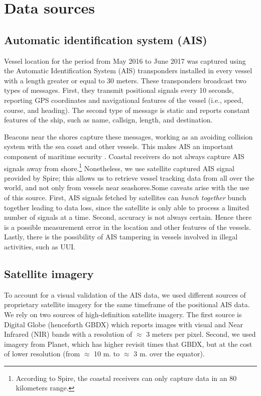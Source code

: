 \section{Data sources}
\subsection{Automatic identification system (AIS)}
Vessel location for the period from May 2016 to June 2017  was captured using the Automatic 
Identification System (AIS) transponders installed in every vessel with a length greater or equal to 
30 meters. These transponders broadcast two types of messages. First, they transmit positional signals 
every 10 seconds, reporting GPS coordinates and navigational features of the vessel (i.e., speed, course, 
and heading). The second type of message is static and reports constant features of the ship, such as name, 
callsign, length, and destination. 

Beacons near the shores capture these messages, working as an avoiding collision system with the sea coast and 
other vessels. This makes AIS an important component of maritime security \cite{Tetreault2005}. 
Coastal receivers do not always capture AIS signals away from shore.\footnote{According to Spire, the coastal 
receivers can only capture data in an 80 kilometers range.} Nonetheless, we use satellite captured AIS signal 
provided by Spire; this allows us to retrieve vessel tracking data from all over the world, and not only from 
vessels near seashores.Some caveats arise with the use of this source. First, AIS signals fetched by satellites
can \textit{bunch together} bunch together leading to data loss, since the satellite is only able to process a 
limited number of signals at a time. Second, accuracy is not always certain. Hence there is a possible measurement 
error in the location and other features of the vessels. Lastly, there is the possibility of AIS tampering in 
vessels involved in illegal activities, such as UUI. 

\subsection{Satellite imagery}

To account for a visual validation of the AIS data, we used different sources of proprietary 
satellite imagery for the same timeframe of the positional AIS data. We rely on two sources of 
high-definition satellite imagery. The first source is Digital Globe (henceforth GBDX) which reports
images with visual and Near Infrared (NIR) bands with a resolution of $\approx$ 3 meters per pixel.
Second, we used imagery from Planet, which has higher revisit times that GBDX, but at the cost of lower 
resolution (from $\approx$ 10 m. to $\approx$ 3 m. over the equator). 

